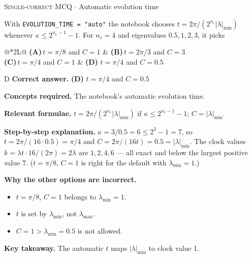 \documentclass[11pt,a4paper]{article}
\newcommand{\optlabel}[1]{\textbf{(#1)}}
\newcommand{\correctlabel}[1]{\textcolor{okgreen}{\textbf{(#1)}\,\ding{51}}}
\newenvironment{qitem}[1]{\begin{list}{}{\setlength{\leftmargin}{3.3em}\setlength{\labelwidth}{3.1em}%
  \setlength{\labelsep}{0.2em}\setlength{\topsep}{3pt}\setlength{\parsep}{3pt}}\item[\textbf{Q.#1}\hfill]}{\end{list}}
\newcommand{\qsep}{\par\vspace{2pt}{\color{black!15}\hrule}\vspace{4pt}}
\newcommand{\qmeta}[2]{{\footnotesize\color{black!60}\textsc{#1} \;$\cdot$\; #2}\par}
\begin{document}
\begin{qitem}{47}
\qmeta{Single-correct MCQ}{Automatic evolution time}
With \texttt{EVOLUTION\_TIME = "auto"} the notebook chooses $t = 2\pi/(2^{n_c}|\lambda|_{\min})$ whenever $\kappa \le 2^{n_c - 1} - 1$. For $n_c = 4$ and eigenvalues $0.5, 1, 2, 3$, it picks
\par\smallskip\noindent\begin{tabularx}{\linewidth}{@{}*{2}{L}@{}}
\optlabel{A}\,$t = \pi/8$ and $C = 1$ & \optlabel{B}\,$t = 2\pi/3$ and $C = 3$ \\[3pt]
\optlabel{C}\,$t = \pi/4$ and $C = 1$ & \correctlabel{D}\,$t = \pi/4$ and $C = 0.5$
\end{tabularx}
\end{qitem}
\begin{solbox}{D}
\textbf{\color{brand}Correct answer.} \textcolor{okgreen}{\textbf{(D)}} $t = \pi/4$ and $C = 0.5$

\textbf{\color{brand}Concepts required.} The notebook's automatic evolution time.

\textbf{\color{brand}Relevant formulae.} $t = 2\pi/(2^{n_c}|\lambda|_{\min})$ if $\kappa \le 2^{n_c-1} - 1$; $C = |\lambda|_{\min}$.

\textbf{\color{brand}Step-by-step explanation.} $\kappa = 3/0.5 = 6 \le 2^3 - 1 = 7$, so $t = 2\pi/(16\cdot0.5) = \pi/4$ and $C = 2\pi/(16t) = 0.5 = |\lambda|_{\min}$. The clock values $k = \lambda t\cdot16/(2\pi) = 2\lambda$ are $1, 2, 4, 6$ --- all exact
and below the largest positive value $7$. ($t = \pi/8$, $C = 1$ is right for the default with $\lambda_{\min} = 1$.)

\textbf{\color{brand}Why the other options are incorrect.}
\begin{itemize}[leftmargin=2.4em, itemsep=1pt, topsep=2pt]
\item[\textbf{(A)}] $t = \pi/8$, $C = 1$ belongs to $\lambda_{\min} = 1$.
\item[\textbf{(B)}] $t$ is set by $\lambda_{\min}$, not $\lambda_{\max}$.
\item[\textbf{(C)}] $C = 1 > \lambda_{\min} = 0.5$ is not allowed.
\end{itemize}
\textbf{\color{brand}Key takeaway.} The automatic $t$ maps $|\lambda|_{\min}$ to clock value 1.
\end{solbox}
\qsep
\end{document}
